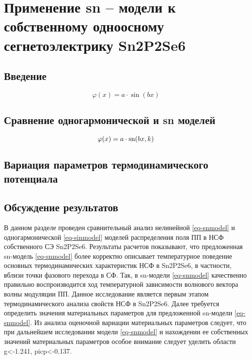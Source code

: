 
\chapter{Применение sn – модели к собственному одноосному сегнетоэлектрику Sn2P2Se6}\label{ch-appl}

\section{Введение}\label{sec-applintro}

\begin{equation}
\varphi(x) = a \cdot \sin(bx)
\label{eq-sinmodel}
\end{equation}

\section{Сравнение одногармонической и sn моделей}\label{sec-compare}

\begin{equation}
\varphi(x) = a \cdot \operatorname{sn}(bx, k)
\label{eq-snmodel}
\end{equation}

\section{Вариация параметров термодинамического потенциала}\label{sec-variate}

\section{Обсуждение результатов}\label{sec-discuss}

В данном разделе проведен сравнительный анализ нелинейной \ref{eq-snmodel} и одногармонической \ref{eq-sinmodel} моделей распределения поля ПП в НСФ собственного СЭ Sn2P2Se6. Результаты расчетов показывают, что предложенная sn-модель \ref{eq-snmodel} более корректно описывает температурное поведение основных термодинамических характеристик НСФ в Sn2P2Se6, в частности, вблизи точки фазового перехода в СФ. Так, в sn-модели \ref{eq-snmodel} качественно правильно воспроизводится ход температурной зависимости волнового вектора волны модуляции ПП.
Данное исследование является первым этапом термодинамического анализа свойств НСФ в Sn2P2Se6. Далее требуется определить значения материальных параметров для предложенной sn-модели \ref{eq-snmodel}. Из анализа оценочной вариации материальных параметров следует, что при дальнейшем исследовании модели \ref{eq-snmodel} и нахождении ее собственных значений материальных параметров особое внимание следует уделить области g<-1.241, picp<-0.137.